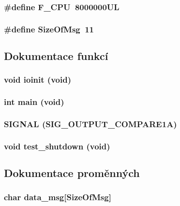 \subsubsection{\setlength{\rightskip}{0pt plus 5cm}\#define F\_\-CPU~8000000UL}\label{main_8c_43bafb28b29491ec7f871319b5a3b2f8}


\subsubsection{\setlength{\rightskip}{0pt plus 5cm}\#define SizeOfMsg~11}\label{main_8c_8639f3cdce498b36b4f11b82726f3857}




\subsection{Dokumentace funkcí}
\subsubsection{\setlength{\rightskip}{0pt plus 5cm}void ioinit (void)}\label{main_8c_f63a4042de4220d64088f03ef65f9dbf}


\subsubsection{\setlength{\rightskip}{0pt plus 5cm}int main (void)}\label{main_8c_840291bc02cba5474a4cb46a9b9566fe}


\subsubsection{\setlength{\rightskip}{0pt plus 5cm}SIGNAL (SIG\_\-OUTPUT\_\-COMPARE1A)}\label{main_8c_cc0188f99a5e4cb2df4cf3d81fc373ef}


\subsubsection{\setlength{\rightskip}{0pt plus 5cm}void test\_\-shutdown (void)}\label{main_8c_69f95b1ec6b9c81ade176f604a9b2034}




\subsection{Dokumentace proměnných}
\subsubsection{\setlength{\rightskip}{0pt plus 5cm}char {\bf data\_\-msg}[SizeOfMsg]}\label{main_8c_644ab1e6fbad5b17be3f8141d1662682}


